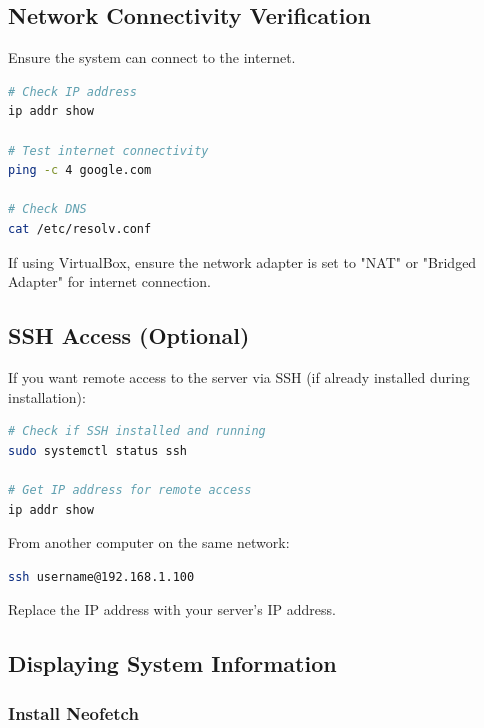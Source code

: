 \subsection{Network Connectivity Verification}

Ensure the system can connect to the internet.

\begin{lstlisting}[language=bash, caption={Check network status}]
# Check IP address
ip addr show

# Test internet connectivity
ping -c 4 google.com

# Check DNS
cat /etc/resolv.conf
\end{lstlisting}

\begin{tipbox}
If using VirtualBox, ensure the network adapter is set to "NAT" or "Bridged Adapter" for internet connection.
\end{tipbox}

\subsection{SSH Access (Optional)}

If you want remote access to the server via SSH (if already installed during installation):

\begin{lstlisting}[language=bash, caption={Check SSH status}]
# Check if SSH installed and running
sudo systemctl status ssh

# Get IP address for remote access
ip addr show
\end{lstlisting}

\begin{examplebox}
From another computer on the same network:
\begin{lstlisting}[language=bash]
ssh username@192.168.1.100
\end{lstlisting}

Replace the IP address with your server's IP address.
\end{examplebox}

\subsection{Displaying System Information}

\subsubsection{Install Neofetch}

